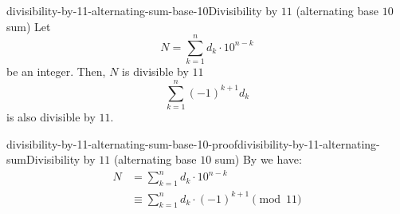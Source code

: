 \documentclass[preview]{standalone}
\begin{document}
\begin{snippetproposition}{divisibility-by-11-alternating-sum-base-10}{Divisibility by \(11\) (alternating base \(10\) sum)}
    Let
    \[
        N = \sum_{k = 1}^n d_k \cdot 10^{n-k}
    \]
    be an integer. Then, \(N\) is divisible by \(11\) \ifandonlyif
    \[
        \sum_{k = 1}^n {(-1)}^{k+1} d_k
    \]
    is also divisible by \(11\).
\end{snippetproposition}

\begin{snippetproof}{divisibility-by-11-alternating-sum-base-10-proof}{divisibility-by-11-alternating-sum}{Divisibility by \(11\) (alternating base \(10\) sum)}
    By  we have:
    \begin{align*}
        N &= \sum_{k = 1}^n d_k \cdot 10^{n-k} \\
        &\equiv \sum_{k = 1}^n d_k \cdot {(-1)}^{k+1} \pmod{11}
    \end{align*}
\end{snippetproof}
\end{document}
